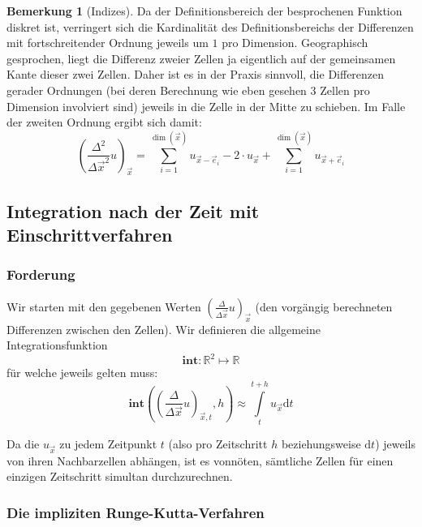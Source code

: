 \documentclass[11pt]{article} %
\theoremstyle{definition}
\newtheorem*{bemerkung}{Bemerkung}
\begin{document}
\begin{bemerkung}[Indizes]
Da der Definitionsbereich der besprochenen Funktion diskret ist, verringert sich die Kardinalität des Definitionsbereichs der Differenzen mit fortschreitender Ordnung jeweils um $1$ pro Dimension. Geographisch gesprochen, liegt die Differenz zweier Zellen ja eigentlich auf der gemeinsamen Kante dieser zwei Zellen. Daher ist es in der Praxis sinnvoll, die Differenzen gerader Ordnungen (bei deren Berechnung wie eben gesehen 3 Zellen pro Dimension involviert sind) jeweils in die Zelle in der Mitte zu schieben. Im Falle der zweiten Ordnung ergibt sich damit:
\begin{equation}
\left( \frac{\Delta^2}{\Delta \vec x^2} u\right)_{\vec x} =\sum\limits_{i=1}^{\dim(\vec x)} u_{\vec x - \vec e_i}  -2\cdot u_{\vec x} + \sum\limits_{i=1}^{\dim(\vec x)} u_{\vec x + \vec e_i}
\end{equation}
\end{bemerkung}

\subsection{Integration nach der Zeit mit Einschrittverfahren}

\newcommand{\intr}{\mathbf{int}}
\renewcommand{\d}{\mathrm{d}}
\newcommand{\duxt}{\left(\frac{\Delta}{\Delta \vec x}u \right)_{\vec x, t}}
\newcommand{\duxtp}[1]{\left(\frac{\Delta}{\Delta \vec x}u \right)_{\vec x, t + #1 h}}

\subsubsection{Forderung}

Wir starten mit den gegebenen Werten $\left(\frac{\Delta}{\Delta \vec x}u \right)_{\vec x}$ (den vorgängig berechneten Differenzen zwischen den Zellen). Wir definieren die allgemeine Integrationsfunktion
\[
\intr :  \mathbb{R}^2 \mapsto \mathbb{R}
\]
für welche jeweils gelten muss:
\[
\intr\left(\duxt, h \right) \approx \int\limits_t^{t+h} u_{\vec x} \d t
\]

Da die $u_{\vec x}$ zu jedem Zeitpunkt $t$ (also pro Zeitschritt $h$ beziehungsweise $\d t$) jeweils von ihren Nachbarzellen abhängen, ist es vonnöten, sämtliche Zellen für einen einzigen Zeitschritt simultan durchzurechnen.

\subsubsection{Die impliziten Runge-Kutta-Verfahren}
\end{document}

